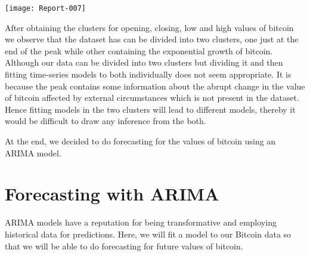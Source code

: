 \documentclass{article}
\begin{document}
\begin{Schunk}
\end{Schunk}
\texttt{[image: Report-007]}

After obtaining the clusters for opening, closing, low and high values of bitcoin we observe that the dataset has can be divided into two clusters, one just at the end of the peak while other containing the exponential growth of bitcoin. Although our data can be divided into two clusters but dividing it and then fitting time-series models to both individually does not seem appropriate. It is because the peak contains some information about the abrupt change in the value of bitcoin affected by external circumstances which is not present in the dataset. Hence fitting models in the two clusters will lead to different models, thereby it would be difficult to draw any inference from the both.

At the end, we decided to do forecasting for the values of bitcoin using an ARIMA model.

\section{Forecasting with ARIMA} \label{secARIMA}
ARIMA models have a reputation for being transformative and employing historical data for predictions. Here, we will fit a model to our Bitcoin data so that we will be able to do forecasting for future values of bitcoin. 
\end{document}
